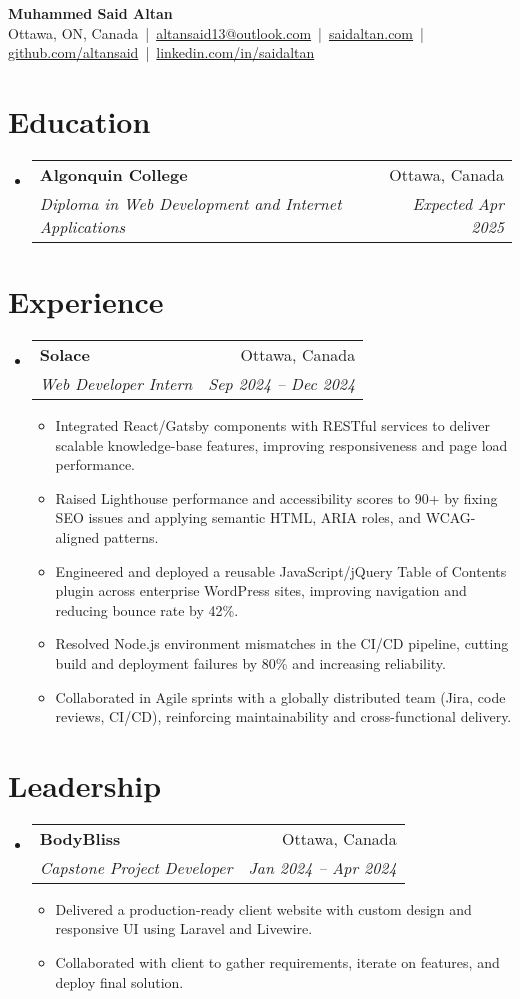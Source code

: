 \documentclass[letterpaper,11pt]{article}
\makeatletter
\newcommand{\resumeItem}[1]{\item{#1}}
\newcommand{\resumeSubheading}[4]{
  \vspace{2pt}\item
  \begin{tabular*}{\textwidth}[t]{l@{\extracolsep{\fill}}r}
    \textbf{#1} & #2 \\
    \emph{#3} & \emph{#4} \\
  \end{tabular*}\vspace{2pt}
}
\newcommand{\resumeItemListStart}{\begin{itemize}[leftmargin=0.15in, itemsep=2pt]}
\newcommand{\resumeItemListEnd}{\end{itemize}}
\newcommand{\resumeSubHeadingListStart}{\begin{itemize}[leftmargin=0in, label={}]}
\newcommand{\resumeSubHeadingListEnd}{\end{itemize}}
\makeatother
\begin{document}
\begin{center}
    {\LARGE \textbf{Muhammed Said Altan}}\\
    Ottawa, ON, Canada \,|\, \href{mailto:altansaid13@outlook.com}{altansaid13@outlook.com} \,|\, 
    \href{https://saidaltan.com}{saidaltan.com} \,|\, 
    \href{https://github.com/altansaid}{github.com/altansaid} \,|\, 
    \href{https://linkedin.com/in/saidaltan}{linkedin.com/in/saidaltan}
\end{center}

\section*{Education}
\resumeSubHeadingListStart
  \resumeSubheading
    {Algonquin College}{Ottawa, Canada}
    {Diploma in Web Development and Internet Applications}{Expected Apr 2025}
\resumeSubHeadingListEnd

\section*{Experience}
\resumeSubHeadingListStart
  \resumeSubheading
    {Solace}{Ottawa, Canada}
    {Web Developer Intern}{Sep 2024 -- Dec 2024}
    \resumeItemListStart
      \resumeItem{Integrated React/Gatsby components with RESTful services to deliver scalable knowledge-base features, improving responsiveness and page load performance.}
      \resumeItem{Raised Lighthouse performance and accessibility scores to 90+ by fixing SEO issues and applying semantic HTML, ARIA roles, and WCAG-aligned patterns.}
      \resumeItem{Engineered and deployed a reusable JavaScript/jQuery Table of Contents plugin across enterprise WordPress sites, improving navigation and reducing bounce rate by 42\%.}
      \resumeItem{Resolved Node.js environment mismatches in the CI/CD pipeline, cutting build and deployment failures by 80\% and increasing reliability.}
      \resumeItem{Collaborated in Agile sprints with a globally distributed team (Jira, code reviews, CI/CD), reinforcing maintainability and cross-functional delivery.}
    \resumeItemListEnd
\resumeSubHeadingListEnd

\section*{Leadership}
\resumeSubHeadingListStart
  \resumeSubheading
    {BodyBliss}{Ottawa, Canada}
    {Capstone Project Developer}{Jan 2024 -- Apr 2024}
    \resumeItemListStart
      \resumeItem{Delivered a production-ready client website with custom design and responsive UI using Laravel and Livewire.}
      \resumeItem{Collaborated with client to gather requirements, iterate on features, and deploy final solution.}
    \resumeItemListEnd
\resumeSubHeadingListEnd
\end{document}
